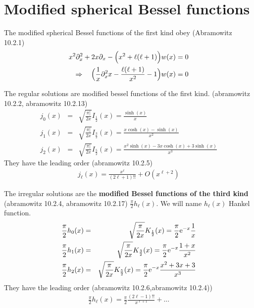 \documentclass[11pt,a4paper]{report}
\begin{document}
\section{Modified spherical Bessel functions}
The modified spherical Bessel functions of the first kind obey
(Abramowitz 10.2.1)
\begin{eqnarray}
x^2\partial_x^2+2x\partial_x-\Bigl(x^2+\ell(\ell+1)\Bigr)w(x)=0
\nonumber\\
\Rightarrow\quad
\Bigl(\frac{1}{x}\partial_x^2x-\frac{\ell(\ell+1)}{x^2}-1\Bigr)w(x)=0
\end{eqnarray}

The regular solutions are modified bessel functions of the first
kind. (abramowitz 10.2.2, abramowitz 10.2.13)
\begin{eqnarray}
j_0(x)&=&\sqrt{\frac{\pi|}{2x}}I_{\frac{1}{2}}(x)=\frac{\sinh(x)}{x}
\nonumber\\
j_1(x)&=&\sqrt{\frac{\pi|}{2x}}I_{\frac{3}{2}}(x)=\frac{x\cosh(x)-\sinh(x)}{x^2}
\nonumber\\
j_2(x)&=&\sqrt{\frac{\pi|}{2x}}I_{\frac{5}{2}}(x)
=\frac{x^2\sinh(x)-3x\cosh(x)+3\sinh(x)}{x^3}
\end{eqnarray}
They have the leading order (abramowitz 10.2.5)
\begin{eqnarray}
j_\ell(x)=\frac{x^\ell}{(2\ell+1)!!}+O(x^{\ell+2})
\end{eqnarray}

The irregular solutions are the \textbf{modified Bessel functions of
  the third kind} (abramowitz 10.2.4, abramowitz 10.2.17)
$\frac{\pi}{2}h_\ell(x)$. We will name $h_\ell(x)$ Hankel function.
\begin{eqnarray}
\frac{\pi}{2}h_0(x)&=&\sqrt{\frac{\pi}{2x}}K_{\frac{1}{2}}(x)
=\frac{\pi}{2}\mathrm{e}^{-x}\frac{1}{x}
\nonumber\\
\frac{\pi}{2}h_1(x)&=&\sqrt{\frac{\pi}{2x}}K_{\frac{3}{2}}(x)
=\frac{\pi}{2}\mathrm{e}^{-x}\frac{1+x}{x^2}
\nonumber\\
\frac{\pi}{2}h_2(x)&=&\sqrt{\frac{\pi}{2x}}K_{\frac{5}{2}}(x)
=\frac{\pi}{2}\mathrm{e}^{-x}\frac{x^2+3x+3}{x^3}
\end{eqnarray}
They have the leading order (abramowitz 10.2.6,abramowitz 10.2.4))
\begin{eqnarray}
\frac{\pi}{2}h_\ell(x)=\frac{\pi}{2}\frac{(2\ell-1)!!}{x^{\ell+1}}
+...
\end{eqnarray}
\end{document}
